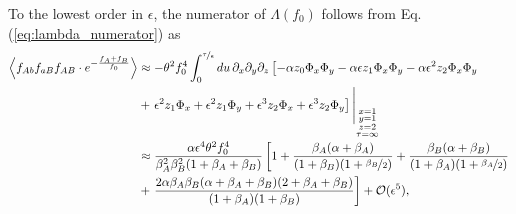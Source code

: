 \documentclass[11pt]{article}
\begin{document}
To the lowest order in $\epsilon$, the numerator of $\Lambda(f_0)$ follows from Eq. (\ref{eq:lambda_numerator}) as
\begin{align}\label{eq:lambda_num_large_rho}
    \left\langle f_{Ab}f_{aB}f_{AB}\cdot e^{-\frac{f_{A}+f_{B}}{f_0}}\right\rangle
 &\approx -\theta^2 f_0^4 \int_0^{\nicefrac{\tau}{\epsilon}} du\, \partial_x\partial_y\partial_z \left[-\alpha z_0\Phi_x\Phi_y -\alpha \epsilon z_1 \Phi_x\Phi_y -\alpha \epsilon^2 z_2 \Phi_x\Phi_y \right. \\ \nonumber
 &+ \left. \epsilon^2 z_1\Phi_x + \epsilon^2 z_1\Phi_y + \epsilon^3 z_2\Phi_x + \epsilon^3 z_2\Phi_y \right]\Bigg\vert_{\substack{x=1 \\ y=1 \\ z=2 \\ \tau=\infty}} \\ \nonumber
 &\approx \frac{\alpha \epsilon^4 \theta^2 f_0^4}{\beta_A^2 \beta_B^2 (1+\beta_A+\beta_B)} \left[1 + \frac{\beta_A(\alpha+\beta_A)}{(1+\beta_B)(1+\nicefrac{\beta_B}{2}) } +  \frac{\beta_B(\alpha+\beta_B)}{(1+\beta_A)(1+\nicefrac{\beta_A}{2})} \right. \\ \nonumber
 &+\left. \frac{2 \alpha \beta_A \beta_B (\alpha+\beta_A+\beta_B)(2+\beta_A+\beta_B)}{(1+\beta_A)(1+\beta_B)} \right]+ \mathcal{O}(\epsilon^5),
\end{align}
\end{document}
